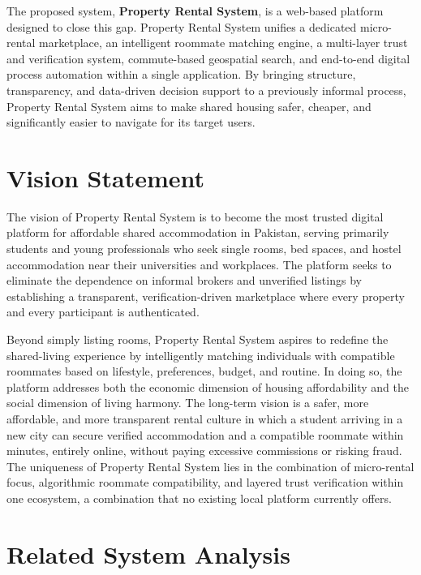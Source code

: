 The proposed system, \textbf{Property Rental System}, is a web-based platform designed to close this gap. Property Rental System unifies a dedicated micro-rental marketplace, an intelligent roommate matching engine, a multi-layer trust and verification system, commute-based geospatial search, and end-to-end digital process automation within a single application. By bringing structure, transparency, and data-driven decision support to a previously informal process, Property Rental System aims to make shared housing safer, cheaper, and significantly easier to navigate for its target users.


\section{Vision Statement}

The vision of Property Rental System is to become the most trusted digital platform for affordable shared accommodation in Pakistan, serving primarily students and young professionals who seek single rooms, bed spaces, and hostel accommodation near their universities and workplaces. The platform seeks to eliminate the dependence on informal brokers and unverified listings by establishing a transparent, verification-driven marketplace where every property and every participant is authenticated.

Beyond simply listing rooms, Property Rental System aspires to redefine the shared-living experience by intelligently matching individuals with compatible roommates based on lifestyle, preferences, budget, and routine. In doing so, the platform addresses both the economic dimension of housing affordability and the social dimension of living harmony. The long-term vision is a safer, more affordable, and more transparent rental culture in which a student arriving in a new city can secure verified accommodation and a compatible roommate within minutes, entirely online, without paying excessive commissions or risking fraud. The uniqueness of Property Rental System lies in the combination of micro-rental focus, algorithmic roommate compatibility, and layered trust verification within one ecosystem, a combination that no existing local platform currently offers.


\section{Related System Analysis}

